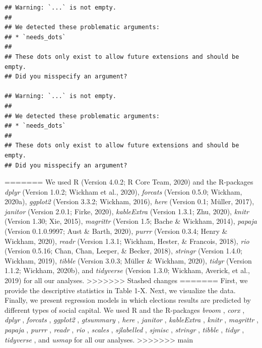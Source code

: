 \documentclass[
  english,
  man]{apa6}
\begin{document}
\begin{verbatim}
## Warning: `...` is not empty.
## 
## We detected these problematic arguments:
## * `needs_dots`
## 
## These dots only exist to allow future extensions and should be empty.
## Did you misspecify an argument?

## Warning: `...` is not empty.
## 
## We detected these problematic arguments:
## * `needs_dots`
## 
## These dots only exist to allow future extensions and should be empty.
## Did you misspecify an argument?
\end{verbatim}
=======
We used R (Version 4.0.2; R Core Team, 2020) and the R-packages \emph{dplyr} (Version 1.0.2; Wickham et al., 2020), \emph{forcats} (Version 0.5.0; Wickham, 2020a), \emph{ggplot2} (Version 3.3.2; Wickham, 2016), \emph{here} (Version 0.1; Müller, 2017), \emph{janitor} (Version 2.0.1; Firke, 2020), \emph{kableExtra} (Version 1.3.1; Zhu, 2020), \emph{knitr} (Version 1.30; Xie, 2015), \emph{magrittr} (Version 1.5; Bache \& Wickham, 2014), \emph{papaja} (Version 0.1.0.9997; Aust \& Barth, 2020), \emph{purrr} (Version 0.3.4; Henry \& Wickham, 2020), \emph{readr} (Version 1.3.1; Wickham, Hester, \& Francois, 2018), \emph{rio} (Version 0.5.16; Chan, Chan, Leeper, \& Becker, 2018), \emph{stringr} (Version 1.4.0; Wickham, 2019), \emph{tibble} (Version 3.0.3; Müller \& Wickham, 2020), \emph{tidyr} (Version 1.1.2; Wickham, 2020b), and \emph{tidyverse} (Version 1.3.0; Wickham, Averick, et al., 2019) for all our analyses.
>>>>>>> Stashed changes
=======
First, we provide the descriptive statistics in Table 1-X. Next, we visualize the data. Finally, we present regression models in which elections results are predicted by different types of social capital.
We used R \autocite[Version 3.6.1;][]{R-base} and the R-packages \emph{broom} \autocite[Version 0.7.0;][]{R-broom}, \emph{corx} \autocite[Version 1.0.6.1;][]{R-corx}, \emph{dplyr} \autocite[Version 1.0.2;][]{R-dplyr}, \emph{forcats} \autocite[Version 0.5.0;][]{R-forcats}, \emph{ggplot2} \autocite[Version 3.3.2;][]{R-ggplot2}, \emph{gtsummary} \autocite[Version 1.3.5;][]{R-gtsummary}, \emph{here} \autocite[Version 0.1;][]{R-here}, \emph{janitor} \autocite[Version 2.0.1;][]{R-janitor}, \emph{kableExtra} \autocite[Version 1.3.1;][]{R-kableExtra}, \emph{knitr} \autocite[Version 1.29;][]{R-knitr}, \emph{magrittr} \autocite[Version 1.5;][]{R-magrittr}, \emph{papaja} \autocite[Version 0.1.0.9997;][]{R-papaja}, \emph{purrr} \autocite[Version 0.3.4;][]{R-purrr}, \emph{readr} \autocite[Version 1.3.1;][]{R-readr}, \emph{rio} \autocite[Version 0.5.16;][]{R-rio}, \emph{scales} \autocite[Version 1.1.1;][]{R-scales}, \emph{sjlabelled} \autocite[Version 1.1.7;][]{R-sjlabelled}, \emph{sjmisc} \autocite[Version 2.8.5;][]{R-sjmisc}, \emph{stringr} \autocite[Version 1.4.0;][]{R-stringr}, \emph{tibble} \autocite[Version 3.0.4;][]{R-tibble}, \emph{tidyr} \autocite[Version 1.1.2;][]{R-tidyr}, \emph{tidyverse} \autocite[Version 1.3.0;][]{R-tidyverse}, and \emph{usmap} \autocite[Version 0.5.1;][]{R-usmap} for all our analyses.
>>>>>>> main
\end{document}

